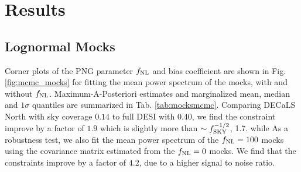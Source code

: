 \section{Results}\label{sec:results}

\subsection{Lognormal Mocks}

Corner plots of the PNG parameter $f_{\rm NL}$ and bias coefficient are shown in Fig. \ref{fig:mcmc_mocks} for fitting the mean power spectrum of the mocks, with and without $f_{\rm NL}$. Maximum-A-Posteriori estimates and marginalized mean, median and $1\sigma$ quantiles are summarized in Tab. \ref{tab:mocksmcmc}. Comparing DECaLS North with sky coverage $0.14$ to full DESI with $0.40$, we find the constraint improve by a factor of $1.9$ which is slightly more than $\sim f_{\rm SKY}^{-1/2}$, 1.7. while As a robustness test, we also fit the mean power spectrum of the $f_{\rm NL}=100$ mocks using the covariance matrix estimated from the $f_{\rm NL}=0$ mocks. We find that the constraints improve by a factor of $4.2$, due to a higher signal to noise ratio.

